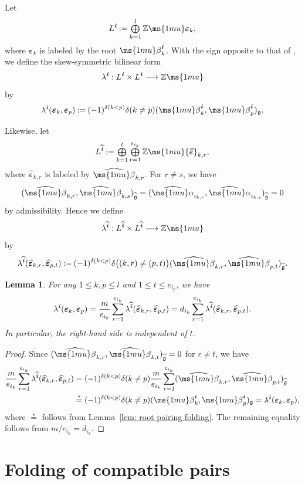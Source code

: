 \documentclass[12pt, leqno]{amsart}
\numberwithin{equation}{section}
\theoremstyle{plain}
\newtheorem{lemma}{Lemma}[section]
\theoremstyle{definition}
\renewcommand{\le}{\leqslant}
\newcommand{\seteq}{\mathbin{:=}}
\newcommand{\soplus}{\mathop{\mbox{\normalsize$\bigoplus$}}\limits}
\newcommand{\g}{\mathfrak{g}}
\newcommand{\Z}{\mathbb{Z}\ms{1mu}}
\newcommand{\al}{{\ms{1mu}\alpha}}
\newcommand{\be}{{\ms{1mu}\beta}}
\newcommand{\ve}{\boldsymbol{\varepsilon}}
\newcommand{\im}{\imath}
\newcommand{\ii}{ \textbf{\textit{i}}}
\newcommand{\hg}{{\widehat{\g}}}
\newcommand{\hal}{\widehat{\al}}
\newcommand{\hbe}{\widehat{\be}}
\newcommand{\hii}{{\widehat{\ii}}}
\newcommand{\hve}{{\widehat{\ve}}}
\begin{document}
Let
\[
L^\ii \seteq \soplus_{k=1}^{l}\Z\ve_k,
\]
where $\ve_k$ is labeled by the root $\be_k^\ii$.
With the sign opposite to that of \cite[(5.4)]{KKOP23F}, we define the skew-symmetric bilinear form
\[
\lambda^\ii:L^\ii\times L^\ii\longrightarrow\Z
\]
by
\begin{align}\label{eq: lambda pairing}
\lambda^\ii(\ve_k,\ve_p) \seteq (-1)^{\delta(k<p)} \delta(k\neq p) (\be_k^\ii,\be_p^\ii)_\g.
\end{align}

Likewise, let
\[
L^\hii \seteq \soplus_{k=1}^{l}\soplus_{r=1}^{e_{i_k}} \Z\hve_{k,r},
\]
where $\hve_{k,r}$ is labeled by $\hbe_{k,r}$.
For $r\neq s$, we have
\[
(\hbe_{k,r},\hbe_{k,s})_\hg = (\hal_{\im_{k,r}},\hal_{\im_{k,s}})_\hg  =0
\]
by admissibility. Hence we define
\[
\lambda^\hii:L^\hii\times L^\hii\longrightarrow\Z
\]
by
\begin{align}\label{eq: lifted lambda pairing}
\lambda^\hii(\hve_{k,r},\hve_{p,t}) \seteq (-1)^{\delta(k<p)} \delta\bigl((k,r)\neq(p,t)\bigr) (\hbe_{k,r},\hbe_{p,t})_\hg.
\end{align}

\begin{lemma}\label{lem: lambda pairing folding}
For any $1\le k,p\le l$ and $1\le t\le e_{i_p}$, we have
\[
\lambda^\ii(\ve_k,\ve_p)
= \frac{m}{e_{i_k}} \sum_{r=1}^{e_{i_k}} \lambda^\hii(\hve_{k,r},\hve_{p,t})
= d_{i_k} \sum_{r=1}^{e_{i_k}} \lambda^\hii(\hve_{k,r},\hve_{p,t}).
\]
In particular, the right-hand side is independent of $t$.
\end{lemma}

\begin{proof}
Since
$(\hbe_{k,r},\hbe_{k,t})_\hg=0$ for $r\neq t$,
we have
\begin{align*}
\frac{m}{e_{i_k}} \sum_{r=1}^{e_{i_k}} \lambda^\hii(\hve_{k,r},\hve_{p,t})
&= (-1)^{\delta(k<p)}\delta(k\neq p) \frac{m}{e_{i_k}} \sum_{r=1}^{e_{i_k}} (\hbe_{k,r},\hbe_{p,t})_\hg\\
& \overset{*}{=} (-1)^{\delta(k<p)}\delta(k\neq p) (\be_k^\ii,\be_p^\ii)_\g = \lambda^\ii(\ve_k,\ve_p),
\end{align*}
where $\overset{*}{=}$ follows from Lemma~\ref{lem: root pairing folding}.
The remaining equality follows from $m/e_{i_k}=d_{i_k}$.
\end{proof}

\section{Folding of compatible pairs} \label{sec: compatible pair folding}
\end{document}
